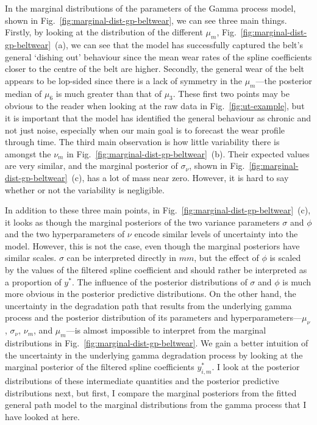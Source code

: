 In the marginal distributions of the parameters of the Gamma process model, shown in Fig.~\ref{fig:marginal-dist-gp-beltwear}, we can see three main things. Firstly, by looking at the distribution of the different $\mu_m$, Fig.~\ref{fig:marginal-dist-gp-beltwear}~(a), we can see that the model has successfully captured the belt's general `dishing out' behaviour since the mean wear rates of the spline coefficients closer to the centre of the belt are higher. Secondly, the general wear of the belt appears to be lop-sided since there is a lack of symmetry in the $\mu_m$---the posterior median of $\mu_6$ is much greater than that of $\mu_3$. These first two points may be obvious to the reader when looking at the raw data in Fig.~\ref{fig:ut-example}, but it is important that the model has identified the general behaviour as chronic and not just noise, especially when our main goal is to forecast the wear profile through time. The third main observation is how little variability there is amongst the $\nu_m$ in Fig.~\ref{fig:marginal-dist-gp-beltwear}~(b). Their expected values are very similar, and the marginal posterior of $\sigma_\nu$, shown in Fig.~\ref{fig:marginal-dist-gp-beltwear}~(c), has a lot of mass near zero. However, it is hard to say whether or not the variability is negligible.

In addition to these three main points, in Fig.~\ref{fig:marginal-dist-gp-beltwear}~(c), it looks as though the marginal posteriors of the two variance parameters $\sigma$ and $\phi$ and the two hyperparameters of $\nu$ encode similar levels of uncertainty into the model. However, this is not the case, even though the marginal posteriors have similar scales. $\sigma$ can be interpreted directly in $mm$, but the effect of $\phi$ is scaled by the values of the filtered spline coefficient and should rather be interpreted as a proportion of $y^*$. The influence of the posterior distributions of $\sigma$ and $\phi$ is much more obvious in the posterior predictive distributions. On the other hand, the uncertainty in the degradation path that results from the underlying gamma process and the posterior distribution of its parameters and hyperparameters---$\mu_\nu$, $\sigma_\nu$, $\nu_m$, and $\mu_m$---is almost impossible to interpret from the marginal distributions in Fig.~\ref{fig:marginal-dist-gp-beltwear}. We gain a better intuition of the uncertainty in the underlying gamma degradation process by looking at the marginal posterior of the filtered spline coefficients $y^*_{i, m}$. I look at the posterior distributions of these intermediate quantities and the posterior predictive distributions next, but first, I compare the marginal posteriors from the fitted general path model to the marginal distributions from the gamma process that I have looked at here.

